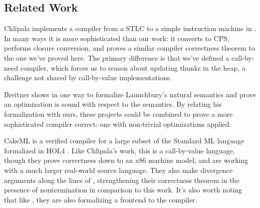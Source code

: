 \subsection{Related Work}

Chlipala implements a compiler from a STLC to a simple instruction machine in
\cite{chlipala2007certified}. In many ways it is more sophisticated than our 
work: it converts to CPS, performs closure conversion, and proves a similar
compiler correctness theorem to the one we've proved here. The primary
difference is that we've defined a call-by-need compiler, which forces us to
reason about updating thunks in the heap, a challenge not shared by
call-by-value implementations.

Breitner shows in \cite{breitnerthesis} one way to formalize Launchbury's
natural semantics \cite{launchburynatural} and prove an optimization is sound
with respect to the semantics. By relating his formalization with ours, these
projects could be combined to prove a more sophisticated compiler correct: one
with non-trivial optimizations applied.

CakeML \cite{cakeml14} is a verified compiler for a large subset of the Standard
ML language formalized in HOL4 \cite{slind2008brief}. Like Chlipala's work, this
is a call-by-value language, though they prove correctness down to an x86
machine model, and are working with a much larger real-world source language.
They also make divergence arguments along the lines of \cite{functionalbigstep},
strengthening their correctness theorem in the presence of nontermination in
comparison to this work. It's also worth noting that like
\cite{leroy2012compcert}, they are also formalizing a frontend to the compiler. 


